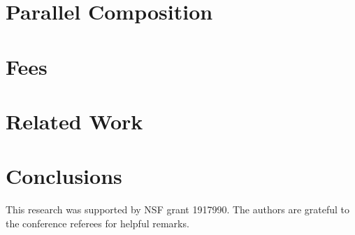 \documentclass[sigconf,review=false,screen,10pt]{acmart} %
\begin{document}
\section{Parallel Composition}


\section{Fees}


\section{Related Work}
\balance

\section{Conclusions}




\begin{acks}
This research was supported by NSF grant 1917990.
The authors are grateful to the conference referees for helpful remarks.
\end{acks}
\newpage



\end{document}
